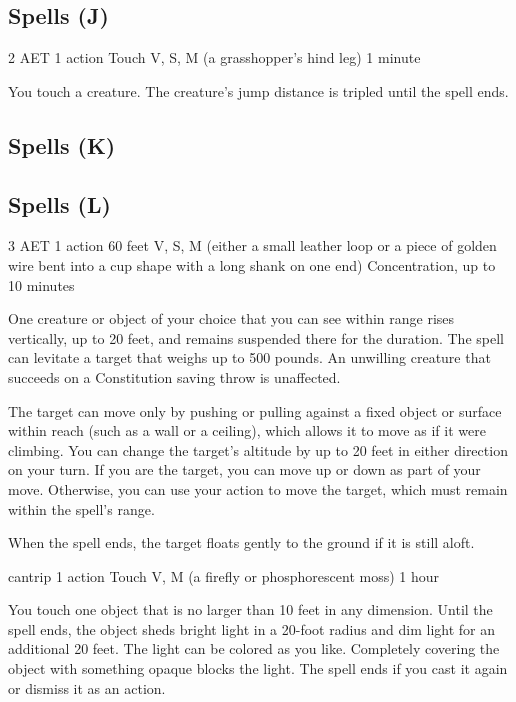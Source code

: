 \subsection{Spells (J)}

\label{spell:jump}
{2 AET}
{1 action}
{Touch}
{V, S, M (a grasshopper's hind leg)}
{1 minute}

You touch a creature. The creature's jump distance is tripled until the spell ends.

\subsection{Spells (K)}

\subsection{Spells (L)}

\label{spell:levitate}
{3 AET}
{1 action}
{60 feet}
{V, S, M (either a small leather loop or a piece of golden wire bent into a cup shape with a long shank on one end)}
{Concentration, up to 10 minutes}

One creature or object of your choice that you can see within range rises vertically, up to 20 feet, and remains suspended there for the duration. The spell can levitate a target that weighs up to 500 pounds. An unwilling creature that succeeds on a Constitution saving throw is unaffected.

The target can move only by pushing or pulling against a fixed object or surface within reach (such as a wall or a ceiling), which allows it to move as if it were climbing. You can change the target's altitude by up to 20 feet in either direction on your turn. If you are the target, you can move up or down as part of your move. Otherwise, you can use your action to move the target, which must remain within the spell's range.

When the spell ends, the target floats gently to the ground if it is still aloft.

\label{spell:light}
{cantrip}
{1 action}
{Touch}
{V, M (a firefly or phosphorescent moss)}
{1 hour}

You touch one object that is no larger than 10 feet in any dimension. Until the spell ends, the object sheds bright light in a 20-foot radius and dim light for an additional 20 feet. The light can be colored as you like. Completely covering the object with something opaque blocks the light. The spell ends if you cast it again or dismiss it as an action.

